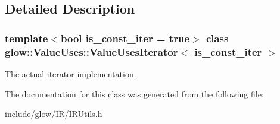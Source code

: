 \subsection{Detailed Description}
\subsubsection*{template$<$bool is\+\_\+const\+\_\+iter = true$>$\newline
class glow\+::\+Value\+Uses\+::\+Value\+Uses\+Iterator$<$ is\+\_\+const\+\_\+iter $>$}

The actual iterator implementation. 

The documentation for this class was generated from the following file\+:\begin{DoxyCompactItemize}
\item 
include/glow/\+I\+R/I\+R\+Utils.\+h\end{DoxyCompactItemize}
